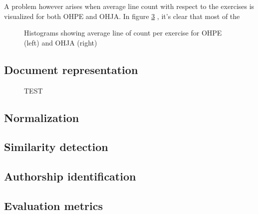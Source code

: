 \newpage

A problem however arises when average line count with respect to the exercises is visualized for both OHPE and OHJA. In figure \ref{fig-hists} , it's clear that most of the 


\begin{figure}[!h]
\centering
\captionsetup[subfigure]{justification=centering}

\begin{subfigure}{.5\textwidth}
    \setlength\figureheight{5cm}
    \setlength\figurewidth{\linewidth}
    
    \label{fig-ohpeavgloc}
\end{subfigure}%
\begin{subfigure}{.5\textwidth}
  \setlength\figureheight{5cm}
    \setlength\figurewidth{\linewidth}
    
    \label{fig-ohjaavgloc}
\end{subfigure}

\caption[Two histograms for corpora]{Histograms showing average line of count per exercise for OHPE (left) and OHJA (right)}
\label{fig-hists}
\end{figure}




\newpage

\subsection{Document representation}


\begin{figure}[!h]
\centering
\setlength\figureheight{5cm}
\setlength\figurewidth{8cm}


\caption{TEST} \label{fig:M1}
\end{figure}

\subsection{Normalization}

\subsection{Similarity detection}


\subsection{Authorship identification}



\subsection{Evaluation metrics}